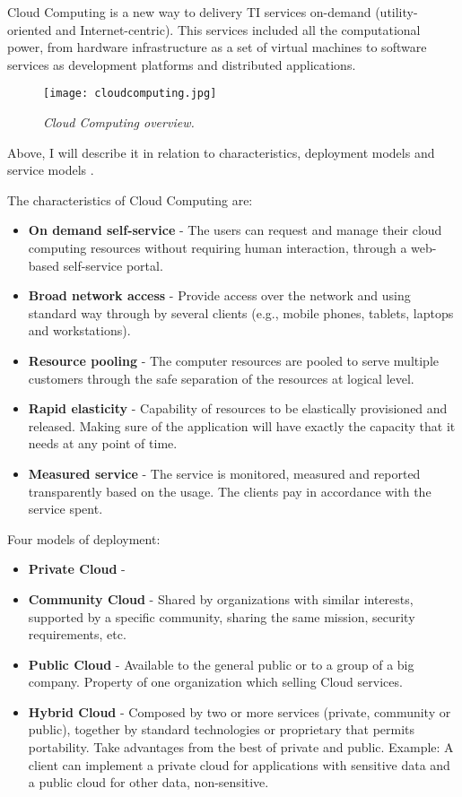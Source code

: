 Cloud Computing is a new way to delivery TI services on-demand (utility-oriented and Internet-centric). This services included all the computational power, from hardware infrastructure as a set of virtual machines to software services as development platforms and distributed applications.

\begin{figure}[!ht]
\begin{center}
\texttt{[image: cloudcomputing.jpg]}
\caption{\small \sl Cloud Computing overview.\label{fig:cloudcomputing}}
\end{center}
\end{figure}

Above, I will describe it in relation to characteristics, deployment models and service models \cite{schouten2013ibm}.

The characteristics of Cloud Computing are:
\begin{itemize}
	\item \textbf{On demand self-service} 	- The users can request and manage their cloud computing resources without requiring human interaction, through a web-based self-service portal.
	\item \textbf{Broad network access 	}	- Provide access over the network and using standard way through by several clients (e.g., mobile phones, tablets, laptops and workstations).
	\item \textbf{Resource pooling 		}	- The computer resources are pooled to serve multiple customers through the safe separation of the resources at logical level.
	\item \textbf{Rapid elasticity 		}	- Capability of resources to be elastically provisioned and released. Making sure of the application will have exactly the capacity that it needs at any point of time.
	\item \textbf{Measured service 		}	- The service is monitored, measured and reported transparently based on the usage. The clients pay in accordance with the service spent.
\end{itemize}

Four models of deployment:
\begin{itemize}
	\item \textbf{Private Cloud}   -
	\item \textbf{Community Cloud} - Shared by organizations with similar interests, supported by a specific community, sharing the same mission, security requirements, etc.
	\item \textbf{Public Cloud}    - Available to the general public or to a group of a big company. Property of one organization which selling Cloud services.
	\item \textbf{Hybrid Cloud}    - Composed by two or more services (private, community or public), together by standard technologies or proprietary that permits portability. Take advantages from the best of private and public. Example: A client can implement a private cloud for applications with sensitive data and a public cloud for other data, non-sensitive.
\end{itemize}

